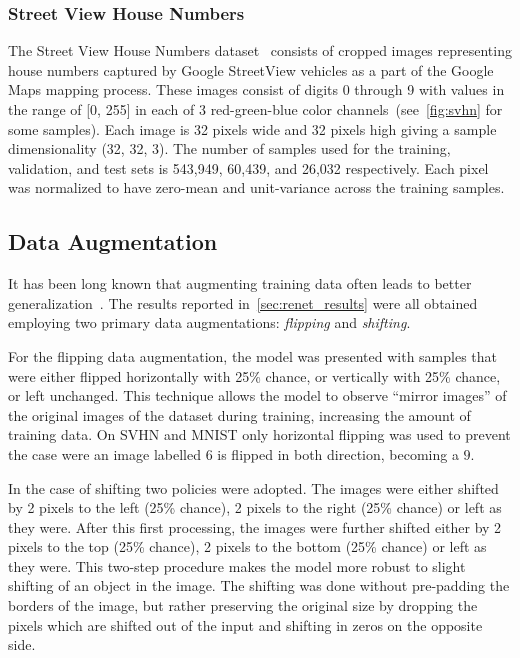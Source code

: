 \subsubsection{Street View House Numbers}
The Street View House Numbers dataset~\citep{Netzer-wkshp-2011} consists
of cropped images representing house numbers captured by Google StreetView
vehicles as a part of the Google Maps mapping process. These images consist of
digits 0 through 9 with values in the range of [0, 255] in each of 3
red-green-blue color channels~(see~\autoref{fig:svhn} for some samples). Each
image is 32 pixels wide and 32 pixels high giving a sample dimensionality (32,
32, 3). The number of samples used for the training, validation, and test sets
is 543,949, 60,439, and 26,032 respectively. Each pixel was normalized to have
zero-mean and unit-variance across the training samples.

\subsection{Data Augmentation}

It has been long known that augmenting training data often leads to better
generalization~\citep[see, e.g.,][]{Krizhevsky-2012}. The results reported
in~\autoref{sec:renet_results} were all obtained employing two primary data
augmentations: {\it flipping} and {\it shifting}.

For the flipping data augmentation, the model was presented with samples that
were either flipped horizontally with 25\% chance, or vertically with 25\%
chance, or left unchanged. This technique allows the model to observe ``mirror
images'' of the original images of the dataset during training, increasing the
amount of training data. On SVHN and MNIST only horizontal flipping was used
to prevent the case were an image labelled $6$ is flipped in both direction,
becoming a $9$.

In the case of shifting two policies were adopted. The images were either
shifted by 2 pixels to the left (25\% chance), 2 pixels to the right (25\%
chance) or left as they were. After this first processing, the images were
further shifted either by 2 pixels to the top (25\% chance), 2 pixels to the
bottom (25\% chance) or left as they were. This two-step procedure makes the
model more robust to slight shifting of an object in the image. The shifting
was done without pre-padding the borders of the image, but rather preserving
the original size by dropping the pixels which are shifted out of the input
and shifting in zeros on the opposite side.

